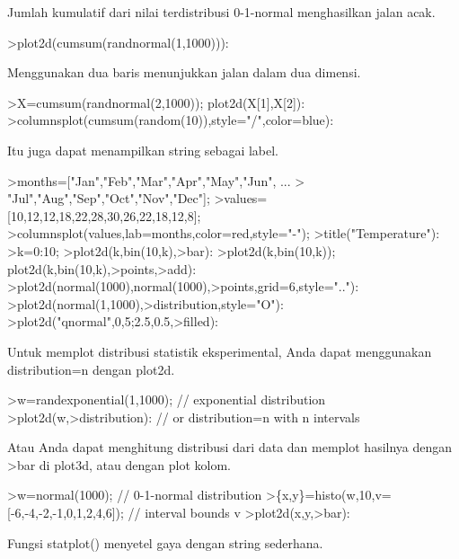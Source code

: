\documentclass[a4paper,10pt]{article}
\begin{document}
\begin{eulernotebook}
\begin{eulercomment}
\begin{eulercomment}
\begin{eulercomment}
\begin{eulercomment}
\begin{eulercomment}
\begin{eulercomment}
\begin{eulercomment}
Jumlah kumulatif dari nilai terdistribusi 0-1-normal menghasilkan
jalan acak.
\end{eulercomment}
\begin{eulerprompt}
>plot2d(cumsum(randnormal(1,1000))):
\end{eulerprompt}
\begin{eulercomment}
Menggunakan dua baris menunjukkan jalan dalam dua dimensi.
\end{eulercomment}
\begin{eulerprompt}
>X=cumsum(randnormal(2,1000)); plot2d(X[1],X[2]):
>columnsplot(cumsum(random(10)),style="/",color=blue):
\end{eulerprompt}
\begin{eulercomment}
Itu juga dapat menampilkan string sebagai label.
\end{eulercomment}
\begin{eulerprompt}
>months=["Jan","Feb","Mar","Apr","May","Jun", ...
>  "Jul","Aug","Sep","Oct","Nov","Dec"];
>values=[10,12,12,18,22,28,30,26,22,18,12,8];
>columnsplot(values,lab=months,color=red,style="-");
>title("Temperature"):
>k=0:10;
>plot2d(k,bin(10,k),>bar):
>plot2d(k,bin(10,k)); plot2d(k,bin(10,k),>points,>add):
>plot2d(normal(1000),normal(1000),>points,grid=6,style=".."):
>plot2d(normal(1,1000),>distribution,style="O"):
>plot2d("qnormal",0,5;2.5,0.5,>filled):
\end{eulerprompt}
\begin{eulercomment}
Untuk memplot distribusi statistik eksperimental, Anda dapat
menggunakan distribution=n dengan plot2d.
\end{eulercomment}
\begin{eulerprompt}
>w=randexponential(1,1000); // exponential distribution
>plot2d(w,>distribution): // or distribution=n with n intervals
\end{eulerprompt}
\begin{eulercomment}
Atau Anda dapat menghitung distribusi dari data dan memplot hasilnya
dengan \textgreater{}bar di plot3d, atau dengan plot kolom.
\end{eulercomment}
\begin{eulerprompt}
>w=normal(1000); // 0-1-normal distribution
>\{x,y\}=histo(w,10,v=[-6,-4,-2,-1,0,1,2,4,6]); // interval bounds v
>plot2d(x,y,>bar):
\end{eulerprompt}
\begin{eulercomment}
Fungsi statplot() menyetel gaya dengan string sederhana.
\end{eulercomment}
\begin{eulerprompt}

\end{eulerprompt}
\end{eulercomment}
\end{eulercomment}
\end{eulercomment}
\end{eulercomment}
\end{eulercomment}
\end{eulercomment}
\end{eulernotebook}
\end{document}

